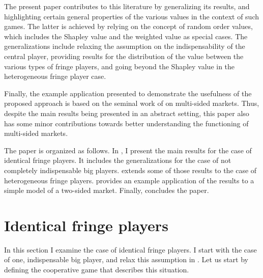 \documentclass[a4paper]{article}
\begin{document}
The present paper contributes to this literature by generalizing its results, and highlighting certain general properties of the various values in the context of such games.
The latter is achieved by relying on the concept of random order values, which includes the Shapley value and the weighted value as special cases.
The generalizations include relaxing the assumption on the indispensability of the central player, providing results for the distribution of the value between the various types of fringe players, and going beyond the Shapley value in the heterogeneous fringe player case.

Finally, the example application presented to demonstrate the usefulness of the proposed approach is based on the seminal work of \textcite{armstrong2006competition} on multi-sided markets.
Thus, despite the main results being presented in an abstract setting, this paper also has some minor contributions towards better understanding the functioning of multi-sided markets.

The paper is organized as follows.
In , I present the main results for the case of identical fringe players.
It includes the generalizations for the case of not completely indispensable big players.
 extends some of those results to the case of heterogeneous fringe players.
 provides an example application of the results to a simple model of a two-sided market.
Finally,  concludes the paper.


\section{Identical fringe players}
\label{sec:one_sided}

In this section I examine the case of identical fringe players.
I start with the case of one, indispensable big player, and relax this assumption in .
Let us start by defining the cooperative game that describes this situation.
\end{document}
